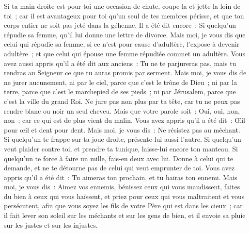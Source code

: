 \begin{multicols}{2}
Si ta main droite est pour toi une occasion de chute, coupe-la et jette-la loin de toi~; car il est avantageux pour toi qu'un seul de tes membres périsse, et que ton corps entier ne soit pas jeté dans la géhenne.
Il a été dit encore~: Si quelqu'un répudie sa femme, qu'il lui donne une lettre de divorce.
Mais moi, je vous dis que celui qui répudie sa femme, si ce n'est pour cause d'adultère, l'expose à devenir adultère~; et que celui qui épouse une femme répudiée commet un adultère.
Vous avez aussi appris qu'il a été dit aux anciens~: Tu ne te parjureras pas, mais tu rendras au Seigneur ce que tu auras promis par serment.
Mais moi, je vous dis de ne jurer aucunement, ni par le ciel, parce que c'est le trône de Dieu~;
ni par la terre, parce que c'est le marchepied de ses pieds~; ni par Jérusalem, parce que c'est la ville du grand Roi.
Ne jure pas non plus par ta tête, car tu ne peux pas rendre blanc ou noir un seul cheveu.
Mais que votre parole soit~: Oui, oui, non, non~; car ce qui est de plus vient du malin.
Vous avez appris qu'il a été dit~: Œil pour œil et dent pour dent.
Mais moi, je vous dis~: Ne résistez pas au méchant. Si quelqu'un te frappe sur ta joue droite, présente-lui aussi l'autre.
Si quelqu'un veut plaider contre toi, et prendre ta tunique, laisse-lui encore ton manteau.
Si quelqu'un te force à faire un mille, fais-en deux avec lui.
Donne à celui qui te demande, et ne te détourne pas de celui qui veut emprunter de toi.
Vous avez appris qu'il a été dit~: Tu aimeras ton prochain, et tu haïras ton ennemi.
Mais moi, je vous dis~: Aimez vos ennemis, bénissez ceux qui vous maudissent, faites du bien à ceux qui vous haïssent, et priez pour ceux qui vous maltraitent et vous persécutent,
afin que vous soyez les fils de votre Père qui est dans les cieux~; car il fait lever son soleil sur les méchants et sur les gens de bien, et il envoie sa pluie sur les justes et sur les injustes.

\end{multicols}
